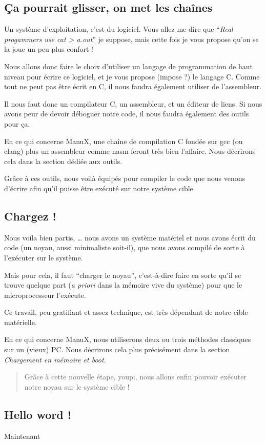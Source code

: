 \subsection{Ça pourrait glisser, on met les chaînes}

   Un système d'exploitation, c'est du logiciel. Vous allez me dire
que ``{\em Real progammers use cat > a.out}'' je suppose, mais cette
fois je vous propose qu'on se la joue un peu plus confort !

   Nous allons donc faire le choix d'utiliser un langage de
programmation de haut niveau pour écrire ce logiciel, et je vous
propose (impose ?) le langage C. Comme tout ne peut pas être écrit en
C, il nous faudra également utiliser de l'assembleur.

   Il nous faut donc un compilateur C, un assembleur, et un éditeur de
liens. Si nous avons peur de devoir déboguer notre code, il nous faudra
également des outils pour ça.

   En ce qui concerne ManuX, une chaîne de compilation C fondée sur gcc
(ou clang) plus un assembleur comme nasm feront très bien
   l'affaire. Nous décrirons cela dans la section dédiée aux outils.

   Grâce à ces outils, nous voilà équipés pour compiler le code que
nous venons d'écrire afin qu'il puisse être exécuté sur notre système
cible.

%
\subsection{Chargez !}

   Nous voila bien partis, \ldots{} nous avons un système matériel et
nous avons écrit du code (un noyau, aussi minimaliste soit-il), que
nous avons compilé de sorte à l'exécuter sur le système.

   Mais pour cela, il faut ``charger le noyau'', c'est-à-dire faire en
sorte qu'il se trouve quelque part ({\em a priori} dans la mémoire
vive du système) pour que le microprocesseur l'exécute.

   Ce travail, peu gratifiant et assez technique, est très dépendant
de notre cible matérielle.

   En ce qui concerne ManuX, nous utiliserons deux ou trois méthodes
classiques sur un (vieux) PC. Nous décrirons cela plus précisément
dans la section {\em Chargement en mémoire et boot}.

\begin{quotation}
   Grâce à cette nouvelle étape, youpi, nous allons enfin pouvoir
exécuter notre noyau sur le système cible !
\end{quotation}

%
\subsection{Hello word !}

   Maintenant
